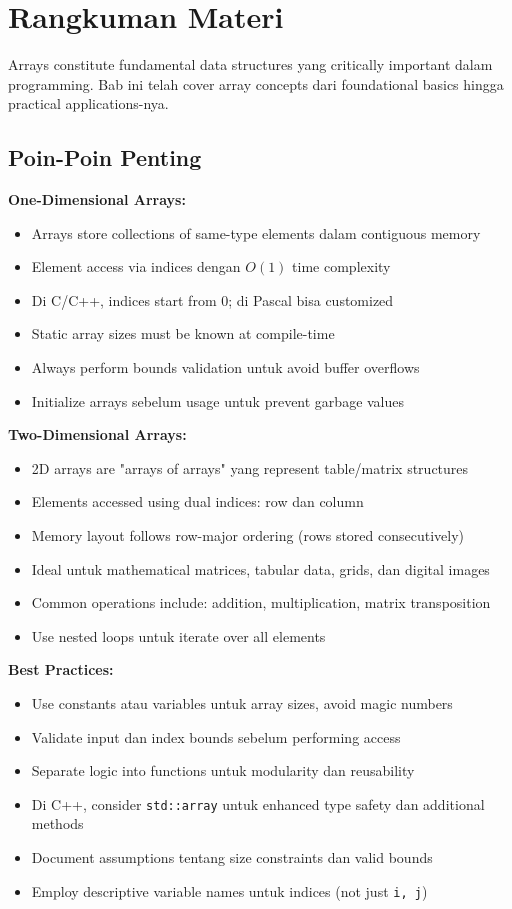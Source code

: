 \documentclass[../main.tex]{subfiles}
\begin{document}
\section{Rangkuman Materi}

Arrays constitute fundamental data structures yang critically important dalam programming. Bab ini telah cover array concepts dari foundational basics hingga practical applications-nya.

\subsection{Poin-Poin Penting}

\textbf{One-Dimensional Arrays:}
\begin{itemize}
  \item Arrays store collections of same-type elements dalam contiguous memory
  \item Element access via indices dengan \(O(1)\) time complexity
  \item Di C/C++, indices start from 0; di Pascal bisa customized
  \item Static array sizes must be known at compile-time
  \item Always perform bounds validation untuk avoid buffer overflows
  \item Initialize arrays sebelum usage untuk prevent garbage values
\end{itemize}

\textbf{Two-Dimensional Arrays:}
\begin{itemize}
  \item 2D arrays are "arrays of arrays" yang represent table/matrix structures
  \item Elements accessed using dual indices: row dan column
  \item Memory layout follows row-major ordering (rows stored consecutively)
  \item Ideal untuk mathematical matrices, tabular data, grids, dan digital images
  \item Common operations include: addition, multiplication, matrix transposition
  \item Use nested loops untuk iterate over all elements
\end{itemize}

\textbf{Best Practices:}
\begin{itemize}
  \item Use constants atau variables untuk array sizes, avoid magic numbers
  \item Validate input dan index bounds sebelum performing access
  \item Separate logic into functions untuk modularity dan reusability
  \item Di C++, consider \texttt{std::array} untuk enhanced type safety dan additional methods
  \item Document assumptions tentang size constraints dan valid bounds
  \item Employ descriptive variable names untuk indices (not just \texttt{i, j})
\end{itemize}
\end{document}
